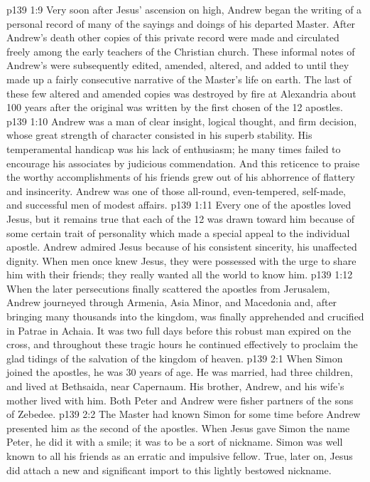 \vs p139 1:9 Very soon after Jesus’ ascension on high, Andrew began the writing of a personal record of many of the sayings and doings of his departed Master. After Andrew’s death other copies of this private record were made and circulated freely among the early teachers of the Christian church. These informal notes of Andrew’s were subsequently edited, amended, altered, and added to until they made up a fairly consecutive narrative of the Master’s life on earth. The last of these few altered and amended copies was destroyed by fire at Alexandria about 100 years after the original was written by the first chosen of the 12 apostles.
\vs p139 1:10 Andrew was a man of clear insight, logical thought, and firm decision, whose great strength of character consisted in his superb stability. His temperamental handicap was his lack of enthusiasm; he many times failed to encourage his associates by judicious commendation. And this reticence to praise the worthy accomplishments of his friends grew out of his abhorrence of flattery and insincerity. Andrew was one of those all\hyp{}round, even\hyp{}tempered, self\hyp{}made, and successful men of modest affairs.
\vs p139 1:11 \pc Every one of the apostles loved Jesus, but it remains true that each of the 12 was drawn toward him because of some certain trait of personality which made a special appeal to the individual apostle. Andrew admired Jesus because of his consistent sincerity, his unaffected dignity. When men once knew Jesus, they were possessed with the urge to share him with their friends; they really wanted all the world to know him.
\vs p139 1:12 \pc When the later persecutions finally scattered the apostles from Jerusalem, Andrew journeyed through Armenia, Asia Minor, and Macedonia and, after bringing many thousands into the kingdom, was finally apprehended and crucified in Patrae in Achaia. It was two full days before this robust man expired on the cross, and throughout these tragic hours he continued effectively to proclaim the glad tidings of the salvation of the kingdom of heaven.
\vs p139 2:1 When Simon joined the apostles, he was 30 years of age. He was married, had three children, and lived at Bethsaida, near Capernaum. His brother, Andrew, and his wife’s mother lived with him. Both Peter and Andrew were fisher partners of the sons of Zebedee.
\vs p139 2:2 The Master had known Simon for some time before Andrew presented him as the second of the apostles. When Jesus gave Simon the name Peter, he did it with a smile; it was to be a sort of nickname. Simon was well known to all his friends as an erratic and impulsive fellow. True, later on, Jesus did attach a new and significant import to this lightly bestowed nickname.
